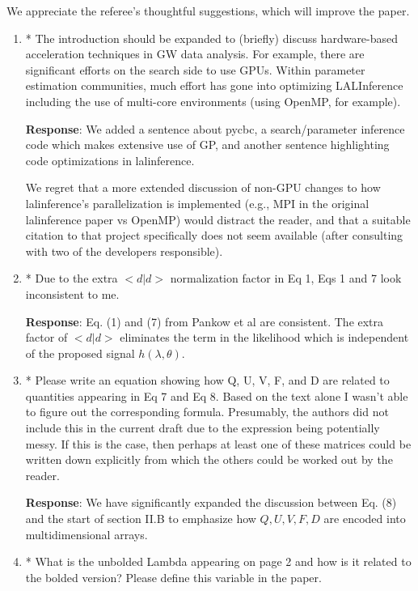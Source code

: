\documentclass[onecolumn]{revtex4}
\begin{document}
We appreciate the referee's thoughtful suggestions, which will improve the paper.


\begin{enumerate}
\item * The introduction should be expanded to (briefly) discuss
hardware-based acceleration techniques in GW data analysis. For
example, there are significant efforts on the search side to use GPUs.
Within parameter estimation communities, much effort has gone into
optimizing LALInference including the use of multi-core environments
(using OpenMP, for example).

\noindent \textbf{Response}:  We added a sentence about pycbc, a search/parameter inference code which makes extensive
use of GP, and another sentence highlighting code optimizations in lalinference.    

We regret that a more extended discussion of non-GPU changes to how lalinference's parallelization is implemented (e.g., MPI in the original
lalinference paper vs OpenMP)  would distract the reader,  and that a suitable citation to that project specifically
does not seem available (after consulting with two of the developers responsible). 

\item * Due to the extra $<d | d >$ normalization factor in Eq 1, Eqs 1 and 7
look inconsistent to me.

\noindent \textbf{Response}:  Eq. (1) and (7) from Pankow et al are consistent.  The extra factor of $<d|d>$ eliminates the term in the likelihood which is independent of
the proposed signal $h(\lambda,\theta)$.

\item * Please write an equation showing how Q, U, V, F, and D are related
to quantities appearing in Eq 7 and Eq 8. Based on the text alone I
wasn't able to figure out the corresponding formula. Presumably, the
authors did not include this in the current draft due to the
expression being potentially messy. If this is the case, then perhaps
at least one of these matrices could be written down explicitly from
which the others could be worked out by the reader.

\noindent \textbf{Response}: We have significantly expanded the discussion between Eq. (8) and the start of section II.B
to emphasize how $Q,U,V,F,D$ are encoded into multidimensional arrays.



\item * What is the unbolded Lambda appearing on page 2 and how is it
related to the bolded version? Please define this variable in the
paper.


\end{enumerate}
\end{document}
